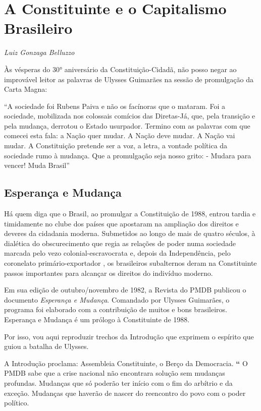 \chapter{A Constituinte e o Capitalismo Brasileiro}

\begin{flushright}
\emph{Luiz Gonzaga Belluzzo}
\end{flushright}

Às vésperas do 30° aniversário da Constituição-Cidadã, não posso negar
ao improvável leitor as palavras de Ulysses Guimarães na sessão de
promulgação da Carta Magna:

``A sociedade foi Rubens Paiva e não os facínoras que o mataram. Foi a
sociedade, mobilizada nos colossais comícios das Diretas-Já, que, pela
transição e pela mudança, derrotou o Estado usurpador. Termino com as
palavras com que comecei esta fala: a Nação quer mudar. A Nação deve
mudar. A Nação vai mudar. A Constituição pretende ser a voz, a letra, a
vontade política da sociedade rumo à mudança. Que a promulgação seja
nosso grito: - Mudara para vencer! Muda Brasil''

\section{Esperança e Mudança}

Há quem diga que o Brasil, ao promulgar a Constituição de 1988, entrou
tardia e timidamente no clube dos países que apostaram na ampliação dos
direitos e deveres da cidadania moderna. Submetidos ao longo de mais de
quatro séculos, à dialética do obscurecimento que regia as relações de
poder numa sociedade marcada pelo vezo colonial-escravocrata e, depois
da Independência, pelo coronelato primário-exportador , os brasileiros
subalternos deram na Constituinte passos importantes para alcançar os
direitos do indivíduo moderno.

Em sua edição de outubro/novembro de 1982, a Revista do PMDB publicou o
documento \emph{Esperança e Mudança}. Comandado por Ulysses Guimarães, o
programa foi elaborado com a contribuição de muitos e bons brasileiros.
Esperança e Mudança é um prólogo à Constituinte de 1988.

Por isso, vou aqui reproduzir trechos da Introdução que exprimem o
espírito que guiou a batalha de Ulysses.

A Introdução proclama: Assembleia Constituinte, o Berço da Democracia.
\textbf{``} O PMDB sabe que a crise nacional não encontrara solução sem
mudanças profundas. Mudanças que só poderão ter início com o fim do
arbítrio e da exceção. Mudanças que haverão de nascer do reencontro do
povo com o poder político.

